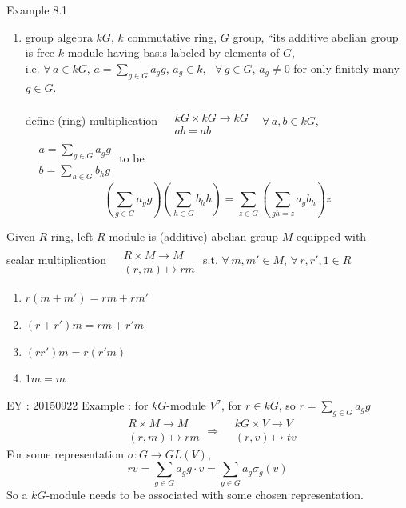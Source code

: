 Example 8.1\cite{dgdt:JRotman2010}
\begin{enumerate}
	\item[(ii)] group algebra $kG$, $k$ commutative ring, $G$ group, ``its additive abelian group is free $k$-module having basis labeled by elements of $G$, \\
	i.e. $\forall \, a \in kG$, $a = \sum_{g\in G} a_g g$, $a_g \in k$, \, $\forall \, g \in G$, $a_g \neq 0$ for only finitely many $g\in G$.  
	
	define (ring) multiplication $\begin{aligned} & \quad \\ 
	& kG \times kG \to kG \\
	& ab = ab \end{aligned}$ \, $\forall \, a,b \in kG$, $\begin{aligned} & \quad \\ 
	& a = \sum_{g\in G} a_g g \\
	& b = \sum_{h \in G} b_h g \end{aligned}$ to be 
	\[
	\left( \sum_{g \in G} a_g g \right) \left( \sum_{h \in G} b_h h \right) = \sum_{ z\in G} \left( \sum_{ gh = z} a_g b_h \right)z
	\]
	
\end{enumerate}

\begin{definition}
	Given $R$ ring, left $R$-module is (additive) abelian group $M$ equipped with \\
	scalar multiplication $\begin{aligned} & \quad \\
	& R \times M \to M \\
	& (r,m) \mapsto rm \end{aligned}$ s.t. $\forall \, m , m' \in M$, $\forall \, r, r' , 1 \in R$
	\begin{enumerate}
		\item[(i)] $r (m+m') = rm + rm' $ 
		\item[(ii)] $(r+r')m = rm + r'm $ 
		\item[(iii)] $(rr')m = r(r'm)$
		\item[(iv)] $1m = m$
	\end{enumerate}
\end{definition}

EY : 20150922 Example : for $kG$-module $V^{\sigma}$, for $r \in kG$, so $r= \sum_{g\in G} a_g g$ 
\[
\begin{aligned} & R \times M \to M \\
& (r,m) \mapsto rm \end{aligned} \Longrightarrow \begin{aligned} & kG \times V \to V \\
& (r,v) \mapsto tv \end{aligned}
\]
For some representation $\sigma : G \to GL(V)$, 
\[
rv = \sum_{g \in G} a_g g \cdot v =\sum_{g\in G} a_g \sigma_g(v)
\]
So a $kG$-module needs to be associated with some chosen representation.  

